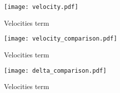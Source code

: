    \begin{figure}
        \texttt{[image: velocity.pdf]}
        \caption{Velocities term}
        \label{fig:m3:velocity}
    \end{figure}

    \begin{figure}
        \texttt{[image: velocity\_comparison.pdf]}
        \caption{Velocities term}
        \label{fig:m3:velocity_comparison}
    \end{figure}

    \begin{figure}
        \texttt{[image: delta\_comparison.pdf]}
        \caption{Velocities term}
        \label{fig:m3:delta_comparison}
    \end{figure}


